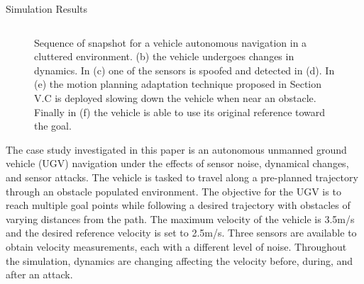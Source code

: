 \begin{section}{Simulation Results}
\begin{figure}[t]
\begin{tabular}{ccc}
\end{tabular}
\caption{ Sequence of snapshot for a vehicle autonomous navigation in a cluttered environment. (b) the vehicle undergoes changes in dynamics. In (c) one of the sensors is spoofed and detected in (d). In (e) the motion planning adaptation technique proposed in Section V.C is deployed slowing down the vehicle when near an obstacle. Finally in (f) the vehicle is able to use its original reference toward the goal.} 


\end{figure}

The case study investigated in this paper is an autonomous unmanned ground vehicle (UGV) navigation under the effects of sensor noise, dynamical changes, and sensor attacks. The vehicle is tasked to travel along a pre-planned trajectory through an obstacle populated environment. 
The objective for the UGV is to reach multiple goal points while following a desired trajectory with obstacles of varying distances from the path. The maximum velocity of the vehicle is 3.5m/s and the desired reference velocity is set to 2.5m/s. Three sensors are available to obtain velocity measurements, each with a different level of noise. Throughout the simulation, dynamics are changing affecting the velocity before, during, and after an attack. 


\end{section}
